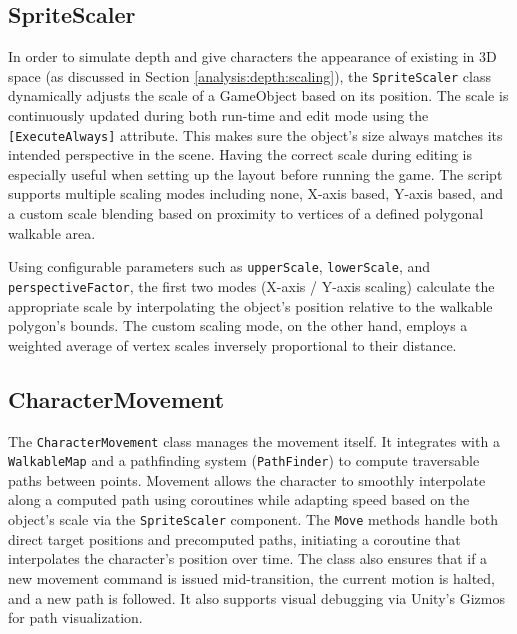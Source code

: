 

\subsection{SpriteScaler}
In order to simulate depth and give characters the appearance of existing in 3D space (as discussed in Section \ref{analysis:depth:scaling}), the \verb|SpriteScaler| class dynamically adjusts the scale of a GameObject based on its position.  The scale is continuously updated during both run-time and edit mode using the \verb|[ExecuteAlways]| attribute. This makes sure the object's size always matches its intended perspective in the scene. Having the correct scale during editing is especially useful when setting up the layout before running the game. The script supports multiple scaling modes including none, X-axis based, Y-axis based, and a custom scale blending based on proximity to vertices of a defined polygonal walkable area.

Using configurable parameters such as \verb|upperScale|, \verb|lowerScale|, and \verb|perspectiveFactor|, the first two modes (X-axis / Y-axis scaling)  calculate the appropriate scale by interpolating the object's position relative to the walkable polygon’s bounds. The custom scaling mode, on the other hand, employs a weighted average of vertex scales inversely proportional to their distance. 


\subsection{CharacterMovement}
The \verb|CharacterMovement| class manages the movement itself. It integrates with a \verb|WalkableMap| and a pathfinding system (\verb|PathFinder|) to compute traversable paths between points. Movement allows the character to smoothly interpolate along a computed path using coroutines while adapting speed based on the object's scale via the \verb|SpriteScaler| component. The \verb|Move| methods handle both direct target positions and precomputed paths, initiating a coroutine that interpolates the character’s position over time. The class also ensures that if a new movement command is issued mid-transition, the current motion is halted, and a new path is followed. It also supports visual debugging via Unity’s Gizmos for path visualization.


